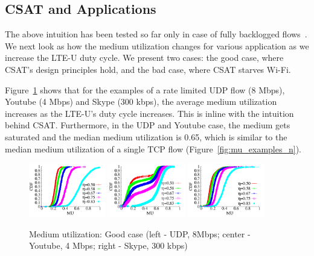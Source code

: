 \subsection{CSAT and Applications}

The above intuition has been tested so far only in case of fully backlogged flows~\cite{qualcommpresentation}. 
We next look as how the medium utilization changes for various application as we increase the LTE-U duty cycle. 
We present two cases: the good case, where CSAT's design principles hold, and the bad case, where CSAT starves Wi-Fi. 

Figure~\ref{fig:csat_mu_good} shows that for the examples of a rate limited UDP flow (8 Mbps), Youtube (4 Mbps) and Skype (300 kbps), the average medium utilization increases as the LTE-U's duty cycle increases. 
This is inline with the intuition behind CSAT. 
Furthermore, in the UDP and Youtube case, the medium gets saturated and the median medium utilization is 0.65, which is similar to the median medium utilization of a single TCP flow (Figure~\ref{fig:mu_examples_n}).

\begin{figure}[htb!]
 \centering
    \includegraphics[width=0.3\textwidth]{./figures/csat_mu_udp8mbps}
    \includegraphics[width=0.3\textwidth]{./figures/youtube_80211bg}
    \includegraphics[width=0.3\textwidth]{./figures/skype_80211bg}
 \caption{Medium utilization: Good case (left - UDP, 8Mbps; center - Youtube, 4 Mbps; right - Skype, 300 kbps) }
  \label{fig:csat_mu_good}
\end{figure}



